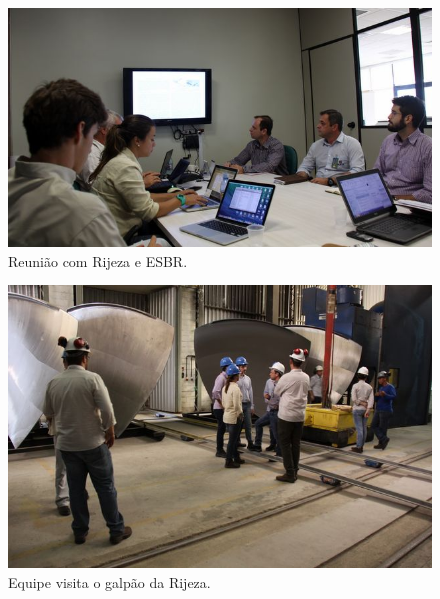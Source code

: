\documentclass[a4paper,11pt,oneside,openany,brazilian,
version=last,draft=false,]{report}
\begin{document}
\begin{twocolumn}
\begin{figure}[H]
\centering
\includegraphics[width=\columnwidth]{Fotos/img_4836.jpg}
\caption{Reunião com Rijeza e ESBR.}
\label{fig:gull}
\end{figure}
\begin{figure}[H]
\centering
\includegraphics[width=\columnwidth]{Fotos/img_4881.jpg}
\caption{Equipe visita o galpão da Rijeza.}
\label{fig:tiger}
\end{figure}



\end{twocolumn}
\end{document}
